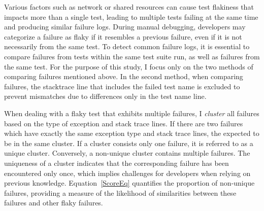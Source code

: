 


Various factors such as network or shared resources can cause test flakiness that impacts more than a single test, leading to multiple tests failing at the same time and producing similar failure logs. During manual debugging, developers may categorize a failure as flaky if it resembles a previous failure, even if it is not necessarily from the same test. To detect common failure logs, it is essential to compare failures from tests within the same test suite run, as well as failures from the same test. 
For the purpose of this study, I focus only on the two methods of comparing failures mentioned above. In the second method, when comparing failures, the stacktrace line that includes the failed test name is excluded to prevent mismatches due to differences only in the test name line.


When dealing with a flaky test that exhibits multiple failures, I \emph{cluster} all failures based on the type of exception and stack trace lines. If there are two failures which have exactly the same exception type and stack trace lines, the expected to be in the same cluster. If a cluster consists only one failure, it is referred to as a unique cluster. Conversely, a non-unique cluster contains multiple failures. The uniqueness of a cluster indicates that the corresponding failure has been encountered only once, which implies challenges for developers when relying on previous knowledge. Equation~\ref{ScoreEq} quantifies the proportion of non-unique failures, providing a measure of the likelihood of similarities between these failures and other flaky failures.



